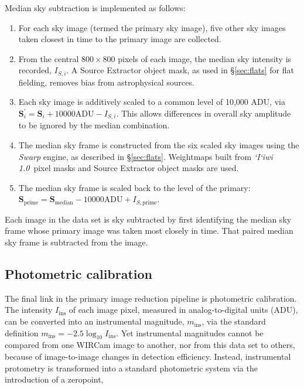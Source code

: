 \documentclass[iop]{emulateapj}
\newcommand{\vect}[1]{\boldsymbol{#1}} %
\newcommand{\sw}[1]{\textit{#1}} %
\newcommand{\iiwione}{\sw{`I`iwi 1.0}}
\begin{document}
Median sky subtraction is implemented as follows:

\begin{enumerate}
	\item For each sky image (termed the primary sky image), five other sky images taken closest in time to the primary image are collected.
	\item From the central $800\times 800$ pixels of each image, the median sky intensity is recorded, $I_{S,i}$. A Source Extractor object mask, as used in \S \ref{sec:flats} for flat fielding, removes bias from astrophysical sources.
	\item Each sky image is additively scaled to a common level of 10,000 ADU, via $\vect{S}_i^\prime =\vect{S}_i + 10000\mathrm{ADU} - I_{S,i}$. This allows differences in overall sky amplitude to be ignored by the median combination.
	\item The median sky frame is constructed from the six scaled sky images using the \sw{Swarp} engine, as described in \S \ref{sec:flats}. Weightmaps built from \iiwione\ pixel masks and Source Extractor object masks are used.
	\item The median sky frame is scaled back to the level of the primary: $\vect{S}_\mathrm{prime} = \vect{S}_\mathrm{median} -10000\mathrm{ADU} + I_{S,\mathrm{prime}}$.
\end{enumerate}

Each image in the data set is sky subtracted by first identifying the median sky frame whose primary image was taken most closely in time. That paired median sky frame is subtracted from the image.


\subsection{Photometric calibration}
\label{sec:photocal}

The final link in the primary image reduction pipeline is photometric calibration. The intensity $I_\mathrm{ins}$ of each image pixel, measured in analog-to-digital units (ADU), can be converted into an instrumental magnitude, $m_\mathrm{ins}$, via the standard definition $m_\mathrm{ins} = -2.5\log_{10}I_\mathrm{ins}$. Yet instrumental magnitudes cannot be compared from one WIRCam image to another, nor from this data set to others, because of image-to-image changes in detection efficiency. Instead, instrumental protometry is transformed into a standard photometric system via the introduction of a zeropoint,
\end{document}
